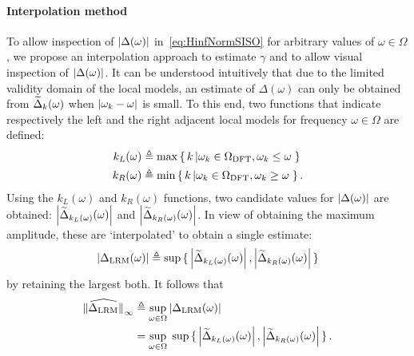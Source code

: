 \vspace{-2em}
\paragraph*{Interpolation method}
To allow inspection of $\left| \Delta(\omega) \right|$ in~\eqref{eq:HinfNormSISO} for arbitrary values of $\omega \in \Omega$, we propose an interpolation approach to estimate $\gamma$ and to allow visual inspection of $\left| \Delta(\omega) \right|$.
It can be understood intuitively that due to the limited validity domain of the local models, an estimate of $\Delta(\omega)$ can only be obtained from $\widetilde{\Delta}_k(\omega)$ when $\left| \omega_k-\omega \right|$ is small.
To this end, two functions that indicate respectively the left and the right adjacent local models for frequency $\omega \in \Omega$ are defined:
\begin{align}
  k_L(\omega) & 
                \isdef
                  \max
                  \set{k 
                    \given{
                      \omega_k \in \DFTGrid, 
                      \omega_k \leq \omega}
                  }\\
  k_R(\omega) & 
                \isdef
                  \min
                  \set{k 
                    \given{
                      \omega_k \in \DFTGrid, 
                      \omega_k \geq \omega}
                  }
  \text{.}
  \label{eq:kL-kR-indexing-functions}
\end{align}
Using the $k_L(\omega)$ and $k_R(\omega)$ functions, two candidate values for $\left| \Delta(\omega) \right|$ are obtained: $\left| \widetilde{\Delta}_{k_L(\omega)}(\omega) \right|$ and $\left| \widetilde{\Delta}_{k_R(\omega)}(\omega) \right|$.
In view of obtaining the maximum amplitude, these are `interpolated' to obtain a single estimate:
\begin{equation}
  \abs{\Delta_{\mathrm{LRM}}(\omega)}
    \isdef
    \sup \set{
       \abs{\LocalModel{\Delta}_{k_L(\omega)}(\omega)},
        \abs{\LocalModel{\Delta}_{k_R(\omega)}(\omega)}
    }
    \label{eq:DeltaLRMInterpolation}
\end{equation}
by retaining the largest both.
It follows that
\begin{align}
  \widehat{\norm[]{\Delta_{\mathrm{LRM}}}}_{\infty} 
    & \isdef
    \sup_{\omega\in\Omega}
    \abs{\Delta_{\mathrm{LRM}}(\omega)} \\
   &  =
      \sup_{\omega\in\Omega} \; 
      \sup \set{
                 \abs{\LocalModel{\Delta}_{k_L(\omega)}(\omega)}, 
                 \abs{\LocalModel{\Delta}_{k_R(\omega)}(\omega)}}
  \label{eq:gammaInterpolOptim}
  \text{.}
\end{align}

